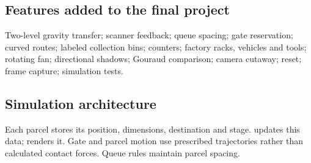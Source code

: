 \subsection{Features added to the final project}
Two-level gravity transfer; scanner feedback; queue spacing; gate reservation; curved routes; labeled collection bins; counters; factory racks, vehicles and tools; rotating fan; directional shadows; Gouraud comparison; camera cutaway; reset; frame capture; simulation tests.

\subsection{Simulation architecture}
Each parcel stores its position, dimensions, destination and stage.  updates this data;  renders it. Gate and parcel motion use prescribed trajectories rather than calculated contact forces. Queue rules maintain parcel spacing.

